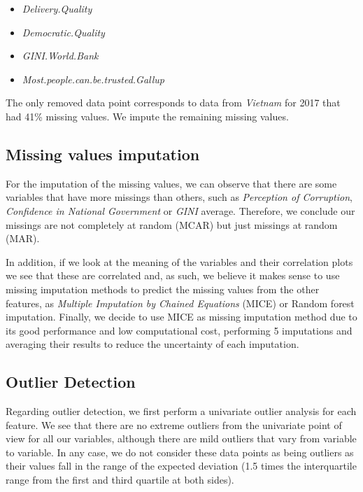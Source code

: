 \documentclass[12pt]{extarticle}
\begin{document}
\begin{itemize}
    \item \textit{Delivery.Quality}
    \item \textit{Democratic.Quality}
    \item \textit{GINI.World.Bank}
    \item \textit{Most.people.can.be.trusted.Gallup}
\end{itemize}

The only removed data point corresponds to data from \textit{Vietnam} for 2017 that had 41\% missing values. We impute the remaining missing values.

\subsection{Missing values imputation}

For the imputation of the missing values, we can observe that there are some variables that have more missings than others, such as \textit{Perception of Corruption}, \textit{Confidence in National Government} or \textit{GINI} average. Therefore, we conclude our missings are not completely at random (MCAR) but just missings at random (MAR).

In addition, if we look at the meaning of the variables and their correlation plots we see that these are correlated and, as such, we believe it makes sense to use missing imputation methods to predict the missing values from the other features, as \textit{Multiple Imputation by Chained Equations} (MICE) or Random forest imputation. Finally, we decide to use MICE as missing imputation method due to its good performance and low computational cost, performing 5 imputations and averaging their results to reduce the uncertainty of each imputation.

\subsection{Outlier Detection}

Regarding outlier detection, we first perform a univariate outlier analysis for each feature. We see that there are no extreme outliers from the univariate point of view for all our variables, although there are mild outliers that vary from variable to variable. In any case, we do not consider these data points as being outliers as their values fall in the range of the expected deviation (1.5 times the interquartile range from the first and third quartile at both sides).
\end{document}
